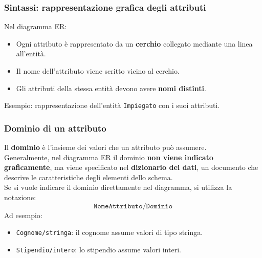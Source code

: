 \subsubsection{Sintassi: rappresentazione grafica degli attributi}

Nel diagramma ER:
\begin{itemize}
    \item Ogni attributo è rappresentato da un \textbf{cerchio} collegato mediante una linea all'entità.
    \item Il nome dell'attributo viene scritto vicino al cerchio.
    \item Gli attributi della stessa entità devono avere \textbf{nomi distinti}.
\end{itemize}
\noindent \textcolor{verdeEsempio}{Esempio}: rappresentazione dell'entità \texttt{Impiegato} con i suoi attributi.

\begin{center}
\end{center}

\subsubsection{Dominio di un attributo}

Il \textbf{dominio} è l'insieme dei valori che un attributo può assumere.\\
Generalmente, nel diagramma ER il dominio \textbf{non viene indicato graficamente}, ma viene specificato nel \textbf{dizionario dei dati}, un documento che descrive le caratteristiche degli elementi dello schema.\\
Se si vuole indicare il dominio direttamente nel diagramma, si utilizza la notazione:
\[
\texttt{NomeAttributo/Dominio}
\]
Ad esempio:
\begin{itemize}
    \item \texttt{Cognome/stringa}: il cognome assume valori di tipo stringa.
    \item \texttt{Stipendio/intero}: lo stipendio assume valori interi.
\end{itemize}

